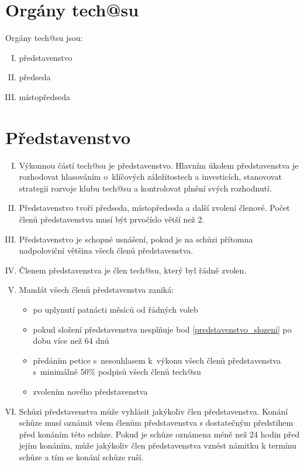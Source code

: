 \documentclass[10pt]{article}
\begin{document}
\section{Orgány tech@su} %
Orgány tech@su jsou:
	\begin{enumerate}[I.]
	\item představenstvo 
	\item předseda  
	\item místopředseda  
	\end{enumerate}

\section{Představenstvo} %
	\begin{enumerate}[I.]
	\item Výkonnou částí tech@su je představenstvo. Hlavním úkolem představenstva je rozhodovat hlasováním o~klíčových záležitostech a investicích, stanovovat strategii rozvoje klubu tech@su a kontrolovat plnění svých rozhodnutí. 
	\item \label{predstavenstvo_slozeni} Představenstvo tvoří předseda, místopředseda a další zvolení členové. Počet členů představenstva musí být prvočíslo větší než 2.
	\item Představenstvo je schopné usnášení, pokud je na schůzi přítomna nadpoloviční většina všech členů představenstva.
	\item Členem představenstva je člen tech@su, který byl řádně zvolen.
	\item Mandát všech členů představenstva zaniká:
	\begin{itemize}
		\item po uplynutí patnácti měsíců od řádných voleb
		\item pokud složení představenstva nesplňuje bod \ref{predstavenstvo_slozeni} po dobu více než 64 dnů
		\item předáním petice s~nesouhlasem k~výkonu všech členů představenstva s~minimálně 50\% podpisů všech členů tech@su
		\item zvolením nového představenstva
	\end{itemize}

	\item Schůzi představenstva může vyhlásit jakýkoliv člen představenstva. Konání schůze musí oznámit všem členům představenstva s dostatečným předstihem před konáním této schůze. Pokud je schůze oznámena méně než 24 hodin před jejím konáním, může jakýkoliv člen představenstva vznést námitku k termínu schůze a tím se konání schůze ruší.



\end{enumerate}
\end{document}
